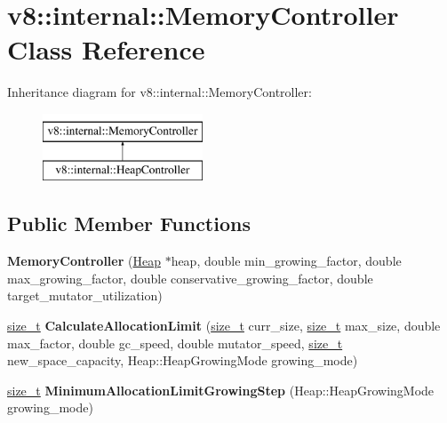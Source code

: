 \hypertarget{classv8_1_1internal_1_1MemoryController}{}\section{v8\+:\+:internal\+:\+:Memory\+Controller Class Reference}
\label{classv8_1_1internal_1_1MemoryController}
Inheritance diagram for v8\+:\+:internal\+:\+:Memory\+Controller\+:\begin{figure}[H]
\begin{center}
\leavevmode
\includegraphics[height=2.000000cm]{classv8_1_1internal_1_1MemoryController}
\end{center}
\end{figure}
\subsection*{Public Member Functions}
\begin{DoxyCompactItemize}
\item 
\mbox{\label{classv8_1_1internal_1_1MemoryController_acb7d7480ad315cf1f2d3931e70df22a1}} 
{\bfseries Memory\+Controller} (\mbox{\hyperlink{classv8_1_1internal_1_1Heap}{Heap}} $\ast$heap, double min\+\_\+growing\+\_\+factor, double max\+\_\+growing\+\_\+factor, double conservative\+\_\+growing\+\_\+factor, double target\+\_\+mutator\+\_\+utilization)
\item 
\mbox{\label{classv8_1_1internal_1_1MemoryController_a185a9c3886d10142bb61c4b445c94c95}} 
\mbox{\hyperlink{classsize__t}{size\+\_\+t}} {\bfseries Calculate\+Allocation\+Limit} (\mbox{\hyperlink{classsize__t}{size\+\_\+t}} curr\+\_\+size, \mbox{\hyperlink{classsize__t}{size\+\_\+t}} max\+\_\+size, double max\+\_\+factor, double gc\+\_\+speed, double mutator\+\_\+speed, \mbox{\hyperlink{classsize__t}{size\+\_\+t}} new\+\_\+space\+\_\+capacity, Heap\+::\+Heap\+Growing\+Mode growing\+\_\+mode)
\item 
\mbox{\label{classv8_1_1internal_1_1MemoryController_a6641492b25c65c40dfa1395a3c97aeec}} 
\mbox{\hyperlink{classsize__t}{size\+\_\+t}} {\bfseries Minimum\+Allocation\+Limit\+Growing\+Step} (Heap\+::\+Heap\+Growing\+Mode growing\+\_\+mode)
\end{DoxyCompactItemize}
